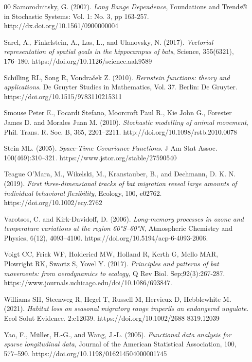 \documentclass[preprint,12pt,authoryear]{elsarticle}
\begin{document}
\begin{thebibliography}{00}
 Samorodnitsky, G.  (2007). \textit{Long Range Dependence}, Foundations and Trends® in Stochastic Systems: Vol. 1: No. 3, pp 163-257. http://dx.doi.org/10.1561/0900000004

  Sarel, A., Finkelstein, A., Las, L., and Ulanovsky, N. (2017).
  \textit{Vectorial representation of spatial goals in the hippocampus of bats},
  Science,
  355(6321),
  176--180.
  https://doi.org/10.1126/science.aak9589

Schilling RL, Song R, Vondra\v{c}ek Z. (2010).
{\it Bernstein functions: theory and applications}.
De Gruyter Studies in Mathematics, Vol. 37.
Berlin: De Gruyter.
https://doi.org/10.1515/9783110215311

Smouse Peter E., Focardi Stefano, Moorcroft Paul R., Kie John G., Forester James D. and Morales Juan M. (2010). {\it Stochastic modelling of animal movement,} Phil. Trans. R. Soc. B, 365,  2201–2211.
http://doi.org/10.1098/rstb.2010.0078

 Stein ML. (2005). {\it Space-Time Covariance Functions}. J Am Stat Assoc. 100(469):310--321. https://www.jstor.org/stable/27590540

  Teague O’Mara, M., Wikelski, M., Kranstauber, B., and Dechmann, D. K. N. (2019).
  \textit{First three-dimensional tracks of bat migration reveal large amounts of individual behavioral flexibility},
  Ecology,
  100,
  e02762.
   https://doi.org/10.1002/ecy.2762

Varotsos, C. and Kirk-Davidoff, D. (2006).
\textit{Long-memory processes in ozone and temperature variations at the region 60°S–60°N},
Atmospheric Chemistry and Physics,
6(12),
4093--4100.
https://doi.org/10.5194/acp-6-4093-2006.

 Voigt CC, Frick WF, Holderied MW, Holland R, Kerth G, Mello MAR, Plowright RK, Swartz S, Yovel Y. (2017). \textit{ Principles
and patterns of bat movements: from aerodynamics to ecology,} Q Rev Biol. Sep;92(3):267-287. https://www.journals.uchicago.edu/doi/10.1086/693847.

 Williams SH, Steenweg R, Hegel T, Russell M, Hervieux D, Hebblewhite M. (2021). {\it  Habitat loss on seasonal migratory range imperils an endangered ungulate}. Ecol Solut Evidence.  2:e12039. https://doi.org/10.1002/2688-8319.12039

  Yao, F., M\"uller, H.-G., and Wang, J.-L. (2005).
  \textit{Functional data analysis for sparse longitudinal data},
  Journal of the American Statistical Association,
  100,
  577--590. https://doi.org/10.1198/016214504000001745

\end{thebibliography}
\end{document}
